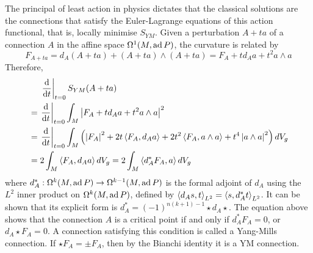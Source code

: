 The principal of least action in physics dictates that the classical solutions
are the connections that satisfy the Euler-Lagrange equations of this action 
functional, that is, locally minimise $S_{YM}$. Given a perturbation
$A+ta$ of a connection  $A$ in the affine space $\Omega^1(M,\operatorname{ad} P)$, the 
curvature is related by
\[
F_{A+ta} = d_A(A+ta) + (A+ta)\wedge (A+ta) = F_A + td_A a + t^2a\wedge a
\] 
Therefore,
\begin{align*}
	&\quad\;\odv{}{t}_{t=0}S_{YM}(A+ta)\\
	&= \odv{}{t}_{t=0} \int_M \abs{F_A + td_A a + t^2a\wedge a}^2 \\
	&= \odv{}{t}_{t=0} \int_M \paren{\abs{F_A}^2 + 2t\gen{F_A,d_A a} 
	+ 2t^2\gen{F_A,a\wedge a} + t^4 \abs{a\wedge a}^2} dV_g \\
	&=  2\int_M  \gen{F_A,d_A a}  dV_g 
	=  2\int_M  \gen{d_A^*F_A, a}  dV_g 
\end{align*}
where $d_A^* :\Omega^{k}(M,\operatorname{ad} P)\to \Omega^{k-1}(M,\operatorname{ad} P)$ is the formal adjoint of 
$d_A$ using the $L^2$ inner product on
$\Omega^k(M,\operatorname{ad} P)$, defined by $\gen{d_A s, t}_{L^2} = \gen{s,d_A^*t}_{L^2}$.
It can be shown that its explicit form is $d_A^* = (-1)^{n(k+1)-1}\star d_A \star$.
The equation above shows that the connection $A$ is a critical point if and only
if  $d_A^* F_A = 0$, or $d_A \star F_A = 0$. A connection satisfying this
condition is called a Yang-Mills connection.
If $\star F_A = \pm F_A$, then by the Bianchi identity it is a YM connection.

